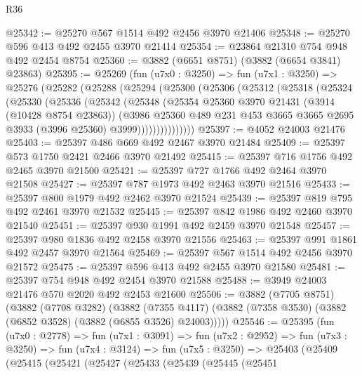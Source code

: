 \begin{lexlean}{R36}
\begin{coremodule}
@25342 := @25270 @567 @1514 @492 @2456 @3970 @21406
@25348 := @25270 @596 @413 @492 @2455 @3970 @21414
@25354 := @23864 @21310 @754 @948 @492 @2454 @8754
@25360 := @3882 (@6651 @8751) (@3882 (@6654 @3841) @23863)
@25395 := @25269
    (fun (u7x0 : @3250) =>
    fun (u7x1 : @3250) =>
    @25276
      (@25282
        (@25288
          (@25294
            (@25300
              (@25306
                (@25312
                  (@25318
                    (@25324
                      (@25330
                        (@25336
                          (@25342
                            (@25348
                              (@25354
                                @25360
                                @3970
                                @21431
                                (@3914 (@10428 @8754 @23863))
                                (@3986
                                  @25360
                                  @489
                                  @231
                                  @453
                                  @3665
                                  @3665
                                  @2695
                                  @3933
                                  (@3996 @25360)
                                  @3999)))))))))))))))
@25397 := @4052 @24003 @21476
@25403 := @25397 @486 @669 @492 @2467 @3970 @21484
@25409 := @25397 @573 @1750 @2421 @2466 @3970 @21492
@25415 := @25397 @716 @1756 @492 @2465 @3970 @21500
@25421 := @25397 @727 @1766 @492 @2464 @3970 @21508
@25427 := @25397 @787 @1973 @492 @2463 @3970 @21516
@25433 := @25397 @800 @1979 @492 @2462 @3970 @21524
@25439 := @25397 @819 @795 @492 @2461 @3970 @21532
@25445 := @25397 @842 @1986 @492 @2460 @3970 @21540
@25451 := @25397 @930 @1991 @492 @2459 @3970 @21548
@25457 := @25397 @980 @1836 @492 @2458 @3970 @21556
@25463 := @25397 @991 @1861 @492 @2457 @3970 @21564
@25469 := @25397 @567 @1514 @492 @2456 @3970 @21572
@25475 := @25397 @596 @413 @492 @2455 @3970 @21580
@25481 := @25397 @754 @948 @492 @2454 @3970 @21588
@25488 := @3949 @24003 @21476 @570 @2020 @492 @2453 @21600
@25506 := @3882
    (@7705 @8751)
    (@3882
      (@7708 @3282)
      (@3882
        (@7355 @4117)
        (@3882 (@7358 @3530) (@3882 (@6852 @3528) (@3882 (@6855 @3526) @24003)))))
@25546 := @25395
    (fun (u7x0 : @2778) =>
    fun (u7x1 : @3091) =>
    fun (u7x2 : @2952) =>
    fun (u7x3 : @3250) =>
    fun (u7x4 : @3124) =>
    fun (u7x5 : @3250) =>
    @25403
      (@25409
        (@25415
          (@25421
            (@25427
              (@25433
                (@25439
                  (@25445
                    (@25451

\end{coremodule}
\end{lexlean}
